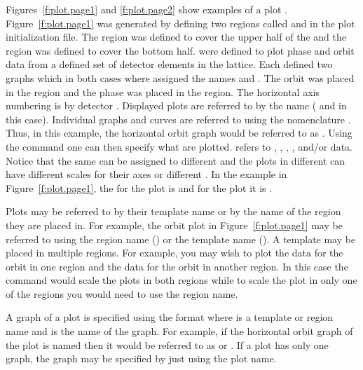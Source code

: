 Figures~\ref{f:plot.page1} and \ref{f:plot.page2} show examples of a
plot . Figure~\ref{f:plot.page1} was generated by defining
two regions called  and  in the plot initialization
file. The  region was defined to cover the upper half of the
 and the  region was defined to cover the bottom
half.  were defined to plot phase and orbit data
from a defined set of detector elements in the lattice. Each
 defined two graphs which in both cases where
assigned the names  and . The orbit  was
placed in the  region and the phase  was
placed in the  region. The horizontal axis numbering is by
detector .  Displayed plots are referred to by the
 name ( and  in this case). Individual
graphs and curves are referred to using the nomenclature
. Thus, in this example, the horizontal orbit
graph would be referred to as .  Using the  command
one can then specify what  are plotted. 
refers to , , , , and/or
 data.  Notice that the same  can be
assigned to different  and the plots in different
 can have different scales for their axes or different
. In the example in Figure~\ref{f:plot.page1}, the
 for the  plot is  and for the
 plot it is .

Plots may be referred to by their template name or by the name of the
region they are placed in. For example, the orbit plot in
Figure~\ref{f:plot.page1} may be referred to using the region name
() or the template name (). A template may be placed
in multiple regions.  For example, you may wish to plot the 
data for the orbit in one region and the  data for the
orbit in another region. In this case the command 
would scale the plots in both regions while to scale the plot in only
one of the regions you would need to use the region name. 

A graph of a plot is specified using the format
 where  is a template or region
name and  is the name of the graph. For example, if the
horizontal orbit graph of the  plot is named  then it
would be referred to as  or . If a plot has only
one graph, the graph may be specified by just using the plot name.

